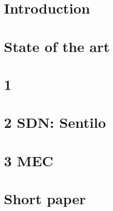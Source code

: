 \documentclass[a4paper, 12pt, twoside,openright]{report}
\begin{document}
\preface
\body

\chapter
	[''The secret of a good sermon is to have a good beginning and a good ending, then having the two as close as possible'' - George Burns]
	{Introduction}
	

\chapter
	[''Given one hour to save the planet, I would spend 59 minutes understanding the problem and one minute resolving it.'' - Albert Einstein]
	{State of the art \cite{bregell_hardware_2015}}
	
	
	
	
	
	

\chapter{1 \cite{bregell_hardware_2015}}
	
	
	
	
	
	
	
	

\chapter{2 SDN: Sentilo \cite{_contiki_2016a}}
	
	
	
	
	
	
	
	

\chapter{3 MEC}
	
	
	
	
	
	
	
	

\chapter{Short paper}
	
	
	
	
	
	
	
	
\end{document}
